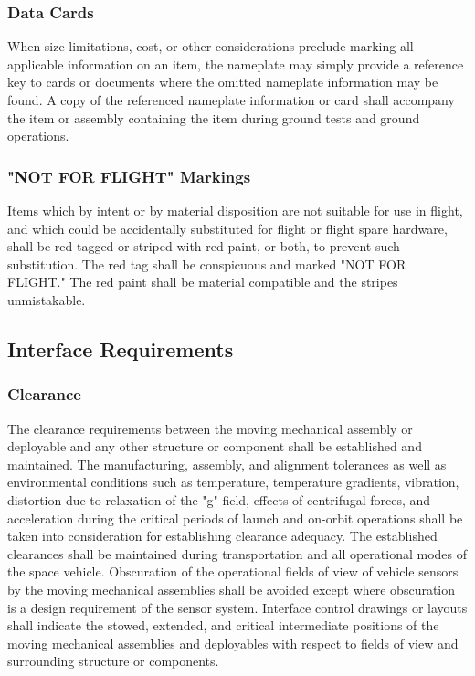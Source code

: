 \documentclass[12pt]{article}
\begin{document}
\subsubsection{Data Cards} %
When size limitations, cost, or other considerations preclude marking all applicable information on an item, the nameplate may simply provide a reference key to cards or documents where the omitted nameplate information may be found. 
A copy of the referenced nameplate information or card shall accompany the item or assembly containing the item during ground tests and ground operations.

\subsubsection{"NOT FOR FLIGHT" Markings} %
Items which by intent or by material disposition are not suitable for use in flight, and which could be accidentally substituted for flight or flight spare hardware, shall be red tagged or striped with red paint, or both, to prevent such substitution. 
The red tag shall be conspicuous and marked "NOT FOR FLIGHT."
The red paint shall be material compatible and the stripes unmistakable.

\subsection{Interface Requirements} %

\subsubsection{Clearance} %
The clearance requirements between the moving mechanical assembly or deployable and any other structure or component shall be established and maintained. 
The manufacturing, assembly, and alignment tolerances as well as environmental conditions such as temperature, temperature gradients, vibration, distortion due to relaxation of the "g" field, effects of centrifugal forces, and acceleration during the critical periods of launch and on-orbit operations shall be taken into consideration for establishing clearance adequacy.
The established clearances shall be maintained during transportation and all operational modes of the space vehicle.
Obscuration of the operational fields of view of vehicle sensors by the moving mechanical assemblies shall be avoided except where obscuration is a design requirement of the sensor system.
Interface control drawings or layouts shall indicate the stowed, extended, and critical intermediate positions of the moving mechanical assemblies and deployables with respect to fields of view and surrounding structure or components.
\end{document}
